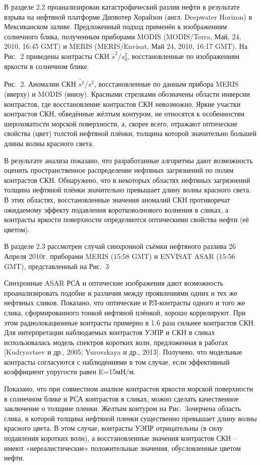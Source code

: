 В разделе 2.2 проанализирован катастрофический разлив нефти в результате взрыва на нефтяной платформе Дипвотер Хорайзон (англ. Deepwater Horizon) в Мексиканском заливе. Предложенный подход применён к изображениям солнечного блика, полученным приборами MODIS (MODIS/Terra, Май, 24, 2010, 16:45 GMT) и MERIS (MERIS/Envisat, Май 24, 2010, 16:17 GMT). На Рис.~2 приведены контрасты СКН $\widetilde{s}^{2} /s_{0}^{2} $, восстановленные по изображениям яркости в солнечном блике.

Рис.~2. Аномалии СКН $\widetilde{s^{2} }/s^{2} $, восстановленные по данным прибора MERIS (вверху) и MODIS (внизу). Красными стрелками обозначены области инверсии контрастов, где восстановление контрастов СКН невозможно. Яркие участки контрастов СКН, обведённые жёлтым контуром, не относятся к особенностям шероховатости морской поверхности, а, скорее всего, отражают  оптические свойства (цвет) толстой нефтяной плёнки, толщина которой значительно большей длины волны красного света.



В результате анализа показано, что разработанные алгоритмы дают возможность оценить пространственное распределение нефтяных загрязнений по полям контрастов СКН. Обнаружено, что в некоторых областях нефтяных загрязнений толщина нефтяной плёнки значительно превышает длину волны красного света. В этих областях, восстановленные значения аномалий СКН противоречат ожидаемому эффекту подавления коротковолнового волнения в сликах, а контрасты яркости поверхности определяются оптическими свойства нефти (её цветом).

В разделе 2.3 рассмотрен случай синхронной съёмки нефтяного разлива 26 Апреля 2010г. приборами MERIS (15:58 GMT) и ENVISAT ASAR (15:56 GMT), представленный на Рис.~3

Синхронные ASAR РСА и оптические изображения дают возможность проанализировать подобие и различия между проявлениями одних и тех же нефтяных сликов. Показано, что оптические и РЛ-контрасты одного и того же слика, сформированного тонкой нефтяной плёнкой, хорошо коррелируют. При этом радиолокационные контрасты примерно в 1.6 раза сильнее контрастов СКН. Для интерпретации наблюдаемых контрастов УЭПР и СКН в сликах использовалась модель спектров коротких волн, предложенная в работах [Kudryavtsev и др., 2005; Yurovskaya и др., 2013]. Получено, что модельные контрасты согласуются с наблюдениями в том случае, если эффективный коэффициент упругости равен E=15мН/м.

Показано, что при совместном анализе контрастов яркости морской поверхности в солнечном блике и РСА контрастов в сликах, можно сделать качественное заключение о толщине пленки. Желтым контуром на Рис.~3очерчена область слика, в которой толщина нефтяной пленки существенно превышает длину волны красного цвета. В этом случае, контрасты УЭПР отрицательны (в силу подавления коротких волн), а восстановленные значения контрастов СКН -- имеют «нереалистические» положительные значения, обусловленные цветом нефти.

